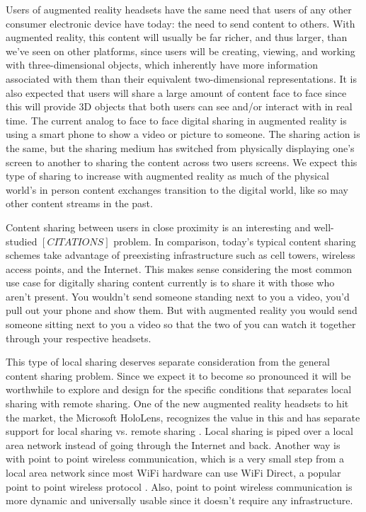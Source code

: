\documentclass[12pt]{report}
\begin{document}
Users of augmented reality headsets have the same need that users of any other consumer electronic device have today: the need to send content to others. With augmented reality, this content will usually be far richer, and thus larger, than we've seen on other platforms, since users will be creating, viewing, and working with three-dimensional objects, which inherently have more information associated with them than their equivalent two-dimensional representations. It is also expected that users will share a large amount of content face to face since this will provide 3D objects that both users can see and/or interact with in real time. The current analog to face to face digital sharing in augmented reality is using a smart phone to show a video or picture to someone. The sharing action is the same, but the sharing medium has switched from physically displaying one's screen to another to sharing the content across two users screens. We expect this type of sharing to increase with augmented reality as much of the physical world's in person content exchanges transition to the digital world, like so may other content streams in the past. \par

Content sharing between users in close proximity is an interesting and well-studied $[CITATIONS]$ problem. %
In comparison, today's typical content sharing schemes take advantage of preexisting infrastructure such as cell towers, wireless access points, and the Internet. This makes sense considering the most common use case for digitally sharing content currently is to share it with those who aren't present. You wouldn't send someone standing next to you a video, you'd pull out your phone and show them. But with augmented reality you would send someone sitting next to you a video so that the two of you can watch it together through your respective headsets. \par

This type of local sharing deserves separate consideration from the general content sharing problem. Since we expect it to become so pronounced it will be worthwhile to explore and design for the specific conditions that separates local sharing with remote sharing. One of the new augmented reality headsets to hit the market, the Microsoft HoloLens, recognizes the value in this and has separate support for local sharing vs. remote sharing \cite{HoloLensSharingLocalNetwork2016}. Local sharing is piped over a local area network instead of going through the Internet and back. Another way is with point to point wireless communication, which is a very small step from a local area network since most WiFi hardware can use WiFi Direct, a popular point to point wireless protocol \cite{WiFiDirectP2p2014}. Also, point to point wireless communication is more dynamic and universally usable since it doesn't require any infrastructure. \par
\end{document}
